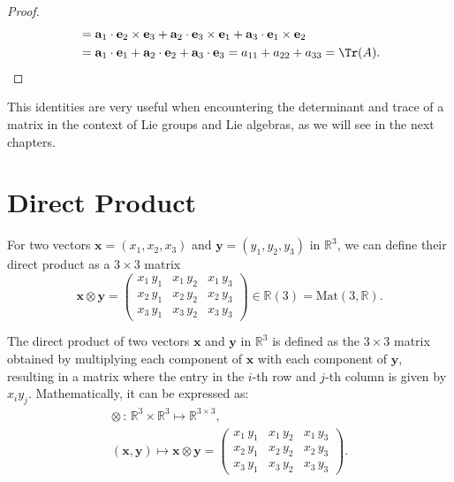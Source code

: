 \begin{proof}
\[\begin{aligned}
                                                                                           & = \mathbf{a}_1 \cdot \mathbf{e}_2 \times \mathbf{e}_3 + \mathbf{a}_2 \cdot \mathbf{e}_3 \times \mathbf{e}_1 + \mathbf{a}_3 \cdot \mathbf{e}_1 \times \mathbf{e}_2 \\
                                                                                           & = \mathbf{a}_1 \cdot \mathbf{e}_1 + \mathbf{a}_2 \cdot \mathbf{e}_2 + \mathbf{a}_3 \cdot \mathbf{e}_3 = a_{11} + a_{22} + a_{33} = \Tr(A).
        \end{aligned}
    \]
\end{proof}

This identities are very useful when encountering the determinant and trace of a matrix in the context of Lie groups and Lie algebras, as we will see in the next chapters.

\section{Direct Product}

For two vectors \(\mathbf{x} = (x_1, x_2, x_3)\) and \(\mathbf{y} = (y_1, y_2, y_3)\) in \(\mathbb{R}^3\), we can define their direct product as a \(3\times 3\) matrix
\[
    \mathbf{x} \otimes \mathbf{y} = \begin{pmatrix}
        x_1\, y_1 & x_1\, y_2 & x_1\, y_3 \\
        x_2\, y_1 & x_2\, y_2 & x_2\, y_3 \\
        x_3\, y_1 & x_3\, y_2 & x_3\, y_3
    \end{pmatrix} \in \mathbb{R}(3) = \text{Mat}(3, \mathbb{R}).
\]
\begin{definition}
    The direct product of two vectors \(\mathbf{x}\) and \(\mathbf{y}\) in \(\mathbb{R}^3\) is defined as the \(3\times 3\) matrix obtained by multiplying each component of \(\mathbf{x}\) with each component of \(\mathbf{y}\), resulting in a matrix where the entry in the \(i\)-th row and \(j\)-th column is given by \(x_i y_j\). Mathematically, it can be expressed as:
    \[
        \begin{aligned}
            \otimes \, : \, \mathbb{R}^3 \times \mathbb{R}^3 \mapsto \mathbb{R}^{3 \times 3}, \\
            (\mathbf{x}, \mathbf{y}) \mapsto \mathbf{x} \otimes \mathbf{y} = \begin{pmatrix}
                                                                                 x_1\, y_1 & x_1\, y_2 & x_1\, y_3 \\
                                                                                 x_2\, y_1 & x_2\, y_2 & x_2\, y_3 \\
                                                                                 x_3\, y_1 & x_3\, y_2 & x_3\, y_3
                                                                             \end{pmatrix}.
        \end{aligned}
    \]
\end{definition}

